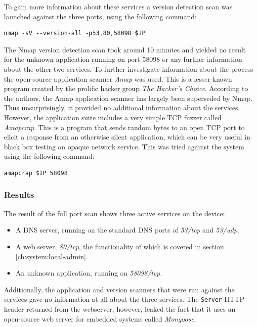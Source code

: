 To gain more information about these services a version detection scan was launched against the three ports, using the following command:
\begin{lstlisting}[frame=tb]
    nmap -sV --version-all -p53,80,58098 $IP
\end{lstlisting}
The Nmap version detection scan took around 10 minutes and yielded no result for the unknown application running on port 58098 or any further information about the other two services. To further investigate information about the process the open-source application scanner \textit{Amap} was used. This is a lesser-known program created by the prolific hacker group \textit{The Hacker's Choice}. According to the authors, the Amap application scanner has largely been superseded by Nmap. Thus unsurprisingly, it provided no additional information about the services. However, the application suite includes a very simple TCP fuzzer called \textit{Amapcrap}. This is a program that sends random bytes to an open TCP port to elicit a response from an otherwise silent application, which can be very useful in black box testing an opaque network service. This was tried against the system using the following command:
\begin{lstlisting}[frame=tb]
    amapcrap $IP 58098
\end{lstlisting}

\subsubsection{Results}
The result of the full port scan shows three active services on the device:
\begin{itemize}
    \item A DNS server, running on the standard DNS ports of \textit{53/tcp} and \textit{53/udp}.
    \item A web server, \textit{80/tcp}, the functionality of which is covered in section \ref{ch:system:local-admin}.
    \item An unknown application, running on \textit{58098/tcp}.
\end{itemize}
Additionally, the application and version scanners that were run against the services gave no information at all about the three services. The \texttt{Server} HTTP header returned from the webserver, however, leaked the fact that it uses an open-source web server for embedded systems called \textit{Mongoose}.

